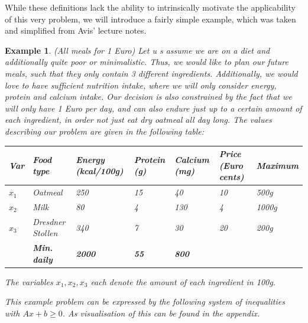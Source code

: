 \documentclass[a4paper, 11pt]{article}
\newtheorem{example}{Example}
\begin{document}
While these definitions lack the ability to intrinsically motivate the applicability of this very problem, we will introduce a fairly simple example, which was taken and simplified from Avis' lecture notes.
\begin{example}(All meals for 1 Euro)\medskip
	Let u
	s assume we are on a diet and additionally quite poor or minimalistic. Thus, we would like to plan our future meals, such that they only contain 3 different ingredients. Additionally, we would love to have sufficient nutrition intake, where we will only consider energy, protein and calcium intake.\medskip
	Our decision is also constrained by the fact that we will only have 1 Euro per day, and can also endure just up to a certain amount of each ingredient, in order not just eat dry oatmeal all day long.\medskip
	The values describing our problem are given in the following table:\medskip
	\begingroup
	\def\arraystretch{1.5}
	\begin{tabular}{|p{0.5cm}|l|p{2cm}|p{1.5cm}|p{1.5cm}|p{1.5cm}|p{2cm}|}
		\hline
		Var&Food type&Energy (kcal/100g)&Protein (g)&Calcium (mg)&Price (Euro cents)&Maximum\\
		\hline
		$x_1$&Oatmeal&250&15&40&10&500g\\
		$x_2$&Milk&80&4&130&4&1000g\\
		$x_3$&Dresdner Stollen&340&7&30&20&200g\\
		\hline
		&\textbf{Min. daily}&\textbf{2000}&\textbf{55}&\textbf{800}&&\\
		\hline
	\end{tabular}
	\endgroup\medskip
	
	The variables $x_1, x_2, x_3$ each denote the amount of each ingredient in 100g.
	
	This example problem can be expressed by the following system of inequalities with $Ax+b\geq0$. As visualisation of this can be found in the appendix.\medskip
	

\end{example}
\end{document}
